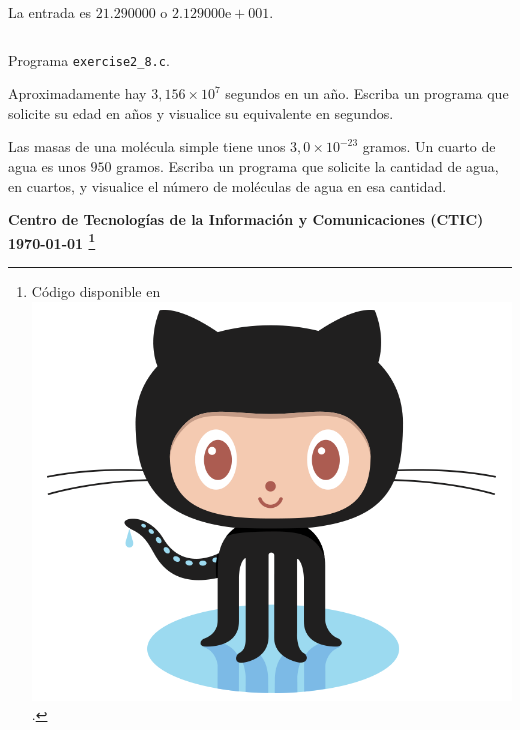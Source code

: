 \documentclass[spanish,addpoints,answers,a4paper]{exam}
\newcommand{\unmarkedfntext}[1]{%
	\begingroup
	\renewcommand\thefootnote{}\footnote{#1}%
	\addtocounter{footnote}{-1}%
	\endgroup
}
\newcommand{\mychar}{%
	\begingroup\normalfont
	\includegraphics[height=\fontcharht\font`\B]{Octocat.png}%
	\endgroup
}
\begin{document}
\begin{questions}
La entrada es $21.290000$ o $2.129000\text{e}+001$.

\begin{solution}
\begin{listing}[H]
\footnotesize
\inputminted{c}{exercise2_8.c}
\caption{Programa \texttt{exercise2\_8.c}.}
\label{lst:2.8}
\end{listing}	
\end{solution}

\question Aproximadamente hay $3,156\times10^{7}$ segundos en un año. Escriba un programa que solicite su edad en años y visualice su equivalente en segundos.

\begin{solution}
	
\end{solution}

\question Las masas de una molécula simple tiene unos $3,0\times10^{-23}$ gramos. Un cuarto de agua es unos $950$ gramos. Escriba un programa que solicite la cantidad de agua, en cuartos, y visualice el número de moléculas de agua en esa cantidad.

\begin{solution}
	
\end{solution}

\end{questions}

\begin{flushright}\bfseries
Centro de Tecnologías de la Información y Comunicaciones (CTIC)\\[2mm]
\today\unmarkedfntext{Código disponible en \href{https://github.com/carlosal1015/C-Programming}{\mychar{}}.}
\end{flushright}
\end{document}
